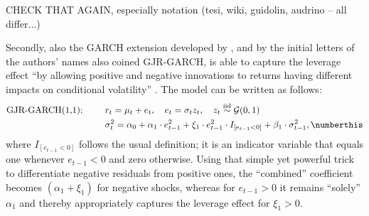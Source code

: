 CHECK THAT AGAIN, especially notation (tesi, wiki, guidolin, audrino -- all differ...)

Secondly, also the GARCH extension developed by \textcite{GJR1993}, and by the initial letters of the authors' names also coined GJR-GARCH, is able to capture the leverage effect \enquote{by allowing \textelp{} positive and negative innovations to returns having different impacts on conditional volatility} \parencite[1779]{GJR1993}. The model can be written as follows:
\begin{align*}
\text{GJR-GARCH(1,1): }\qquad &  r_t = \mu_{t} + e_{t}, \quad e_{t} = \sigma_{t} z_{t},\quad  z_{t} \overset{\text{iid}}{\sim} \mathcal{G}(0,1) \\
& \sigma_t^2 = \alpha_0 + \alpha_1 \cdot e_{t-1}^2 + \xi_1 \cdot e_{t-1}^2 \cdot I_{[e_{t-1}<0]} + \beta_1 \cdot \sigma_{t-1}^2, \numberthis
\end{align*} 
where $I_{[e_{t-1}<0]}$ follows the usual definition; it is an indicator variable that equals one whenever $e_{t-1}<0$ and zero otherwise. Using that simple yet powerful trick to differentiate negative residuals from positive ones, the \enquote{combined} coefficient becomes $(\alpha_1 + \xi_1)$ for negative shocks, whereas for $e_{t-1}>0$ it remains \enquote{solely} $\alpha_1$ and thereby appropriately captures the leverage effect for $\xi_1 > 0$.

